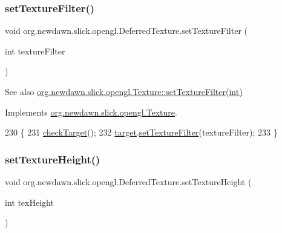 \subsubsection{\texorpdfstring{set\+Texture\+Filter()}{setTextureFilter()}}
{\footnotesize\ttfamily void org.\+newdawn.\+slick.\+opengl.\+Deferred\+Texture.\+set\+Texture\+Filter (\begin{DoxyParamCaption}\item[{int}]{texture\+Filter }\end{DoxyParamCaption})\hspace{0.3cm}{\ttfamily [inline]}}

\begin{DoxySeeAlso}{See also}
\mbox{\hyperlink{interfaceorg_1_1newdawn_1_1slick_1_1opengl_1_1_texture_ad55f0e2e39587c24e3e1b149ac8b16db}{org.\+newdawn.\+slick.\+opengl.\+Texture\+::set\+Texture\+Filter(int)}} 
\end{DoxySeeAlso}


Implements \mbox{\hyperlink{interfaceorg_1_1newdawn_1_1slick_1_1opengl_1_1_texture_ad55f0e2e39587c24e3e1b149ac8b16db}{org.\+newdawn.\+slick.\+opengl.\+Texture}}.


\begin{DoxyCode}
230                                                     \{
231         \mbox{\hyperlink{classorg_1_1newdawn_1_1slick_1_1opengl_1_1_deferred_texture_a22f14bcd9cbd4bf033e2308b90464dce}{checkTarget}}();
232         \mbox{\hyperlink{classorg_1_1newdawn_1_1slick_1_1opengl_1_1_deferred_texture_aa70a4b195d0b965a0099d0e7bc18d9d2}{target}}.\mbox{\hyperlink{classorg_1_1newdawn_1_1slick_1_1opengl_1_1_texture_impl_a83c5c6547a8afa2706a5465988a7261e}{setTextureFilter}}(textureFilter);
233     \}
\end{DoxyCode}
\mbox{\label{classorg_1_1newdawn_1_1slick_1_1opengl_1_1_deferred_texture_a3a992935c479b8f3ac68cc0ddc83d0fb}} 
\subsubsection{\texorpdfstring{set\+Texture\+Height()}{setTextureHeight()}}
{\footnotesize\ttfamily void org.\+newdawn.\+slick.\+opengl.\+Deferred\+Texture.\+set\+Texture\+Height (\begin{DoxyParamCaption}\item[{int}]{tex\+Height }\end{DoxyParamCaption})\hspace{0.3cm}{\ttfamily [inline]}}

